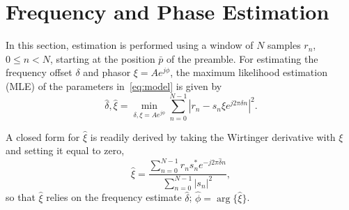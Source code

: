 \section{Frequency and Phase Estimation}%
\label{sec:freq_est}   

In this section, estimation is performed using a window of $N$ samples $r_n$, $0\leq n<N$, starting
at the position $\bar{p}$ of the preamble.
For estimating the frequency offset $\delta$ and phasor
$\xi=Ae^{j\phi}$, the maximum likelihood estimation (MLE) of the
parameters in~\eqref{eq:model} is given by 
\begin{equation}
  \label{eq:ML_f_xi}
  \hat{\delta},\hat{\xi}=\min_{\delta,\xi=Ae^{j\phi}}\sum_{n=0}^{N-1}|r_n-s_n\xi e^{j2\pi\delta n}|^{2}.
\end{equation}

A closed form for $\hat{\xi}$ is readily derived by taking the
Wirtinger derivative with $\xi$ and setting it equal to zero, 
\begin{equation}
  \label{eq:opt_xi}
  \hat{\xi}=\frac{\sum_{n=0}^{N-1}{r_{n}s_n^{*}e^{-j2\pi\hat{\delta} n}}}{\sum_{n=0}^{N-1}|s_{n}|^2},
\end{equation}
so that $\hat{\xi}$ relies on the frequency estimate $\hat{\delta}$; $\hat{\phi}=\arg\{\hat{\xi}\}$. 


